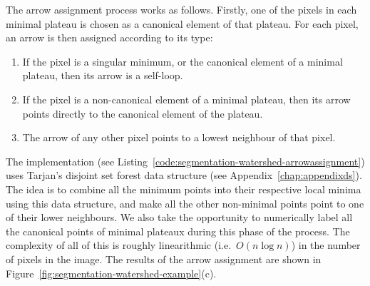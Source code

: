 The arrow assignment process works as follows. Firstly, one of the pixels in each minimal plateau is chosen as a canonical element of that plateau. For each pixel, an arrow is then assigned according to its type:
%
\begin{enumerate}
\item If the pixel is a singular minimum, or the canonical element of a minimal plateau, then its arrow is a self-loop.
\item If the pixel is a non-canonical element of a minimal plateau, then its arrow points directly to the canonical element of the plateau.
\item The arrow of any other pixel points to a lowest neighbour of that pixel.
\end{enumerate}
%
The implementation (see Listing~\ref{code:segmentation-watershed-arrowassignment}) uses Tarjan's disjoint set forest data structure (see Appendix~\ref{chap:appendixds}). The idea is to combine all the minimum points into their respective local minima using this data structure, and make all the other non-minimal points point to one of their lower neighbours. We also take the opportunity to numerically label all the canonical points of minimal plateaux during this phase of the process. The complexity of all of this is roughly linearithmic (i.e.~$O(n \log n)$) in the number of pixels in the image. The results of the arrow assignment are shown in Figure~\ref{fig:segmentation-watershed-example}(c).

